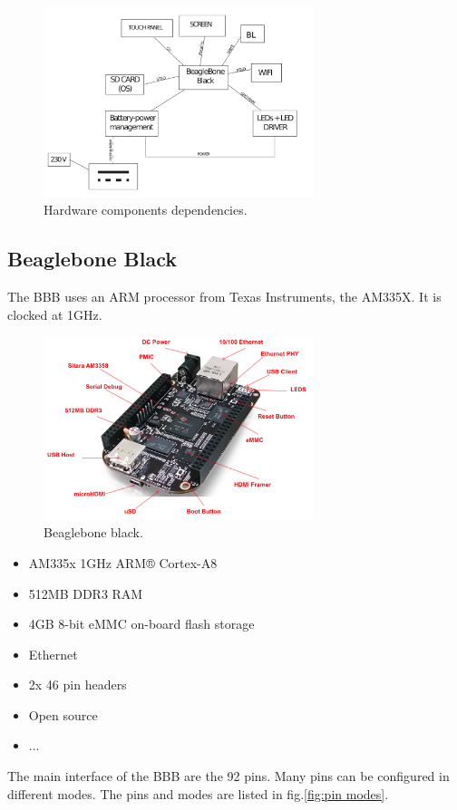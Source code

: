 \begin{figure}[!htb]
    \centering
    \includegraphics[width=0.7\textwidth,keepaspectratio]{chap/hardFig/overall_hardware_dependecies}
    \caption{Hardware components dependencies.}
    \label{fig:hardware dependencies}
\end{figure}

\subsection{Beaglebone Black}
The BBB uses an ARM processor from Texas Instruments, the AM335X. It is clocked at 1GHz.

\begin{figure}[!htb]
    \centering
    \includegraphics[width=0.7\textwidth,keepaspectratio]{chap/hardFig/bbb.png}
    \caption{Beaglebone black.}
    \label{fig:bbb}
\end{figure}

\begin{itemize}
  \item{ AM335x 1GHz ARM® Cortex-A8 }
  \item{512MB DDR3 RAM}
  \item{4GB 8-bit eMMC on-board flash storage}
  \item{Ethernet}
  \item{2x 46 pin headers}
  \item{Open source}
  \item{...}
\end{itemize}
The main interface of the BBB are the 92 pins. Many pins can be configured in different modes. The pins and modes are listed in fig.\ref{fig:pin modes}.
\clearpage


